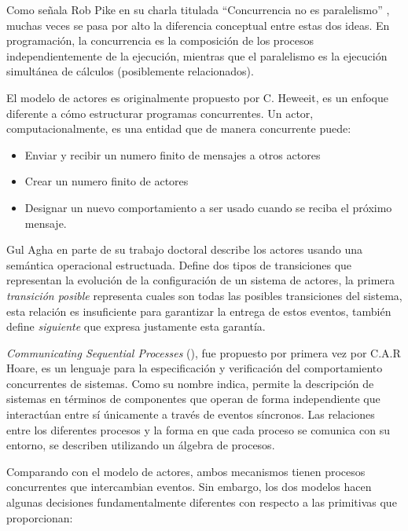 Como señala Rob Pike en su charla titulada ``Concurrencia no es paralelismo'' \cite{rpike13_cnp}, muchas veces se pasa por alto la diferencia conceptual entre estas dos ideas. En programación, la concurrencia es la composición de los procesos independientemente de la ejecución, mientras que el paralelismo es la ejecución simultánea de cálculos (posiblemente relacionados). 

El modelo de actores es originalmente propuesto por C. Heweeit\cite{Wyatt:2013:AC:2663429}, es un enfoque diferente a cómo estructurar programas concurrentes. Un actor, computacionalmente, es una entidad que de manera concurrente puede:

\begin{itemize}
\item Enviar y recibir un numero finito de mensajes a otros actores
\item Crear un numero finito de actores
\item Designar un nuevo comportamiento a ser usado cuando se reciba el próximo mensaje.
\end{itemize}

Gul Agha\cite{Agha:1986:AMC:7929} en parte de su trabajo doctoral describe los actores usando una semántica operacional estructuada\cite{Plotkin81astructural}. Define dos tipos de transiciones que representan la evolución de la configuración de un sistema de actores, la primera \emph{transición posible} representa cuales son todas las posibles transiciones del sistema, esta relación es insuficiente para garantizar la entrega de estos eventos, también define \emph{siguiente} que expresa justamente esta garantía.

\emph{Communicating Sequential Processes} (\CSP), fue propuesto por primera vez por C.A.R Hoare\cite{Hoare:1978:CSP:359576.359585}, es un lenguaje para la especificación y verificación del comportamiento concurrentes de sistemas. Como su nombre indica, \CSP permite la descripción de sistemas en términos de componentes que operan de forma independiente que interactúan entre sí únicamente a través de eventos síncronos. Las relaciones entre los diferentes procesos y la forma en que cada proceso se comunica con su entorno, se describen utilizando un álgebra de procesos.

Comparando \CSP con el modelo de actores, ambos mecanismos tienen procesos concurrentes que intercambian eventos. Sin embargo, los dos modelos hacen algunas decisiones fundamentalmente diferentes con respecto a las primitivas que proporcionan:

